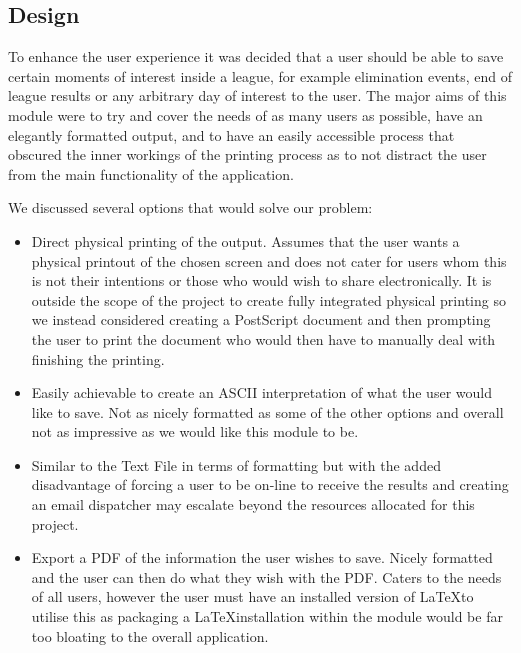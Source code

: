 \subsection{Design}

To enhance the user experience it was decided that a user should be
able to save certain moments of interest inside a league, for example
elimination events, end of league results or any arbitrary day of
interest to the user. The major aims of this module were to try and
cover the needs of as many users as possible, have an elegantly
formatted output, and to have an easily accessible process that
obscured the inner workings of the printing process as to not distract
the user from the main functionality of the application.

We discussed several options that would solve our problem:

\begin{itemize}
  \item[Physical Printing] Direct physical printing of the
    output. Assumes that the user wants a physical printout of the
    chosen screen and does not cater for users whom this is not their
    intentions or those who would wish to share electronically. It is
    outside the scope of the project to create fully integrated
    physical printing so we instead considered creating a PostScript
    document and then prompting the user to print the document who
    would then have to manually deal with finishing the printing.
  \item[Text File] Easily achievable to create an ASCII interpretation
    of what the user would like to save. Not as nicely formatted as
    some of the other options and overall not as impressive as we
    would like this module to be.
  \item[Emailed results] Similar to the Text File in terms of
    formatting but with the added disadvantage of forcing a user to
    be on-line to receive the results and creating an email dispatcher
    may escalate beyond the resources allocated for this project.
  \item[\LaTeX] Export a PDF of the information the user wishes to
    save. Nicely formatted and the user can then do what they wish
    with the PDF. Caters to the needs of all users, however the user
    must have an installed version of \LaTeX to utilise this as
    packaging a \LaTeX installation within the module would be far too
    bloating to the overall application.
\end{itemize}

